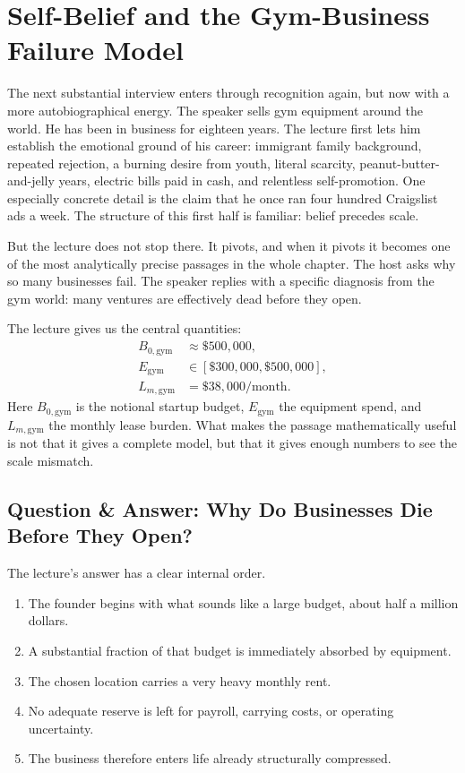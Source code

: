 \section{Self-Belief and the Gym-Business Failure Model}

The next substantial interview enters through recognition again, but now with a more autobiographical energy. The speaker sells gym equipment around the world. He has been in business for eighteen years. The lecture first lets him establish the emotional ground of his career: immigrant family background, repeated rejection, a burning desire from youth, literal scarcity, peanut-butter-and-jelly years, electric bills paid in cash, and relentless self-promotion. One especially concrete detail is the claim that he once ran four hundred Craigslist ads a week. The structure of this first half is familiar: belief precedes scale.

But the lecture does not stop there. It pivots, and when it pivots it becomes one of the most analytically precise passages in the whole chapter. The host asks why so many businesses fail. The speaker replies with a specific diagnosis from the gym world: many ventures are effectively dead before they open.

The lecture gives us the central quantities:
\begin{align}
B_{0,\mathrm{gym}} &\approx \$500{,}000,\\
E_{\mathrm{gym}} &\in [\$300{,}000,\$500{,}000],\\
L_{m,\mathrm{gym}} &= \$38{,}000/\mathrm{month}.
\end{align}
Here \(B_{0,\mathrm{gym}}\) is the notional startup budget, \(E_{\mathrm{gym}}\) the equipment spend, and \(L_{m,\mathrm{gym}}\) the monthly lease burden. What makes the passage mathematically useful is not that it gives a complete model, but that it gives enough numbers to see the scale mismatch.

\subsection{Question \& Answer: Why Do Businesses Die Before They Open?}

The lecture's answer has a clear internal order.

\begin{enumerate}
\item The founder begins with what sounds like a large budget, about half a million dollars.
\item A substantial fraction of that budget is immediately absorbed by equipment.
\item The chosen location carries a very heavy monthly rent.
\item No adequate reserve is left for payroll, carrying costs, or operating uncertainty.
\item The business therefore enters life already structurally compressed.
\end{enumerate}

